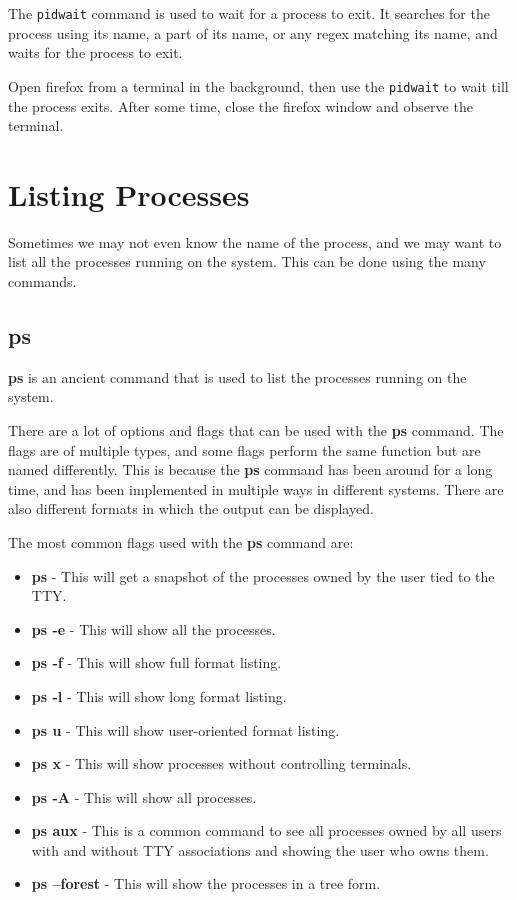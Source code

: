 The \lstinline|pidwait| command is used to wait for a process to exit.
It searches for the process using its name, a part of its name, or any
regex matching its name, and waits for the process to exit.

\begin{exercise}
  Open firefox from a terminal in the background, then use the \lstinline|pidwait|
  to wait till the process exits. After some time, close the firefox window
  and observe the terminal.
\end{exercise}

\vfill
\pagebreak
\section{Listing Processes}

Sometimes we may not even know the name of the process, and we may want to
list all the processes running on the system. This can be done using the
many commands.

\subsection{ps}

\textbf{ps} is an ancient command
that is used to list the processes running on the system.

There are a lot of options and flags that can be used with the \textbf{ps} command.
The flags are of multiple types, and some flags perform the same function but
are named differently. This is because the \textbf{ps} command has been around
for a long time, and has been implemented in multiple ways in different systems.
There are also different formats in which the output can be displayed.

The most common flags used with the \textbf{ps} command are:

\begin{itemize}
  \item \textbf{ps} - This will get a snapshot of the processes owned by the user tied to the TTY.
  \item \textbf{ps -e} - This will show all the processes.
  \item \textbf{ps -f} - This will show full format listing.
  \item \textbf{ps -l} - This will show long format listing.
  \item \textbf{ps u} - This will show user-oriented format listing.
  \item \textbf{ps x} - This will show processes without controlling terminals.
  \item \textbf{ps -A} - This will show all processes.
  \item \textbf{ps aux} - This is a common command to see all processes owned by all users with and without TTY associations and showing the user who owns them.
  \item \textbf{ps --forest} - This will show the processes in a tree form.
\end{itemize}

